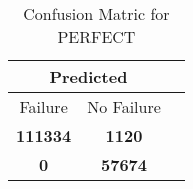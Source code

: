 \begin{table}[] 
\caption{Confusion Matric for PERFECT} 
\label{Table: Prediction Accuracy-DMDPERFECTOnlySunEKF-resetReflectionEKF-top2perfectNoFailurePrediction-Reflection} 
\centering 
\begin{tabular} 
 {@{}ccc@{}} 
\toprule 
\multicolumn{2}{c}{\textbf{Predicted}}
 \\ \midrule 
\multicolumn{1}{|c|}{Failure} & 
\multicolumn{1}{c|}{No Failure}
 \\ \midrule 
\multicolumn{1}{|c|}{\color{green}\textbf{111334}} & 
\multicolumn{1}{c|}{\color{red}\textbf{1120}}
 \\ \midrule 
\multicolumn{1}{|c|}{\color{red}\textbf{0}} & 
\multicolumn{1}{c|}{\color{green}\textbf{57674}}
 \\ \bottomrule 
\end{tabular} 
\end{table} 
